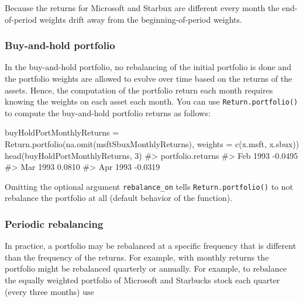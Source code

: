 \documentclass[
  letterpaper,
  DIV=11,
  numbers=noendperiod]{scrreprt}
\newenvironment{Shaded}{\begin{snugshade}}{\end{snugshade}}
\newcommand{\AttributeTok}[1]{\textcolor[rgb]{0.40,0.45,0.13}{#1}}
\newcommand{\CommentTok}[1]{\textcolor[rgb]{0.37,0.37,0.37}{#1}}
\newcommand{\DecValTok}[1]{\textcolor[rgb]{0.68,0.00,0.00}{#1}}
\newcommand{\FunctionTok}[1]{\textcolor[rgb]{0.28,0.35,0.67}{#1}}
\newcommand{\NormalTok}[1]{\textcolor[rgb]{0.00,0.23,0.31}{#1}}
\newcommand{\OtherTok}[1]{\textcolor[rgb]{0.00,0.23,0.31}{#1}}
\theoremstyle{definition}
\theoremstyle{definition}
\theoremstyle{remark}
\begin{document}
Because the returns for Microsoft and Starbux are different every month
the end-of-period weights drift away from the beginning-of-period
weights.

\hypertarget{buy-and-hold-portfolio}{%
\subsubsection{Buy-and-hold portfolio}\label{buy-and-hold-portfolio}}

In the buy-and-hold portfolio, no rebalancing of the initial portfolio
is done and the portfolio weights are allowed to evolve over time based
on the returns of the assets. Hence, the computation of the portfolio
return each month requires knowing the weights on each asset each month.
You can use \texttt{Return.portfolio()} to compute the buy-and-hold
portfolio returns as follows:

\begin{Shaded}
\begin{Highlighting}[]
\NormalTok{buyHoldPortMonthlyReturns }\OtherTok{=} 
  \FunctionTok{Return.portfolio}\NormalTok{(}\FunctionTok{na.omit}\NormalTok{(msftSbuxMonthlyReturns),}
                   \AttributeTok{weights =} \FunctionTok{c}\NormalTok{(x.msft, x.sbux))}
\FunctionTok{head}\NormalTok{(buyHoldPortMonthlyReturns, }\DecValTok{3}\NormalTok{)}
\CommentTok{\#\textgreater{}          portfolio.returns}
\CommentTok{\#\textgreater{} Feb 1993           {-}0.0495}
\CommentTok{\#\textgreater{} Mar 1993            0.0810}
\CommentTok{\#\textgreater{} Apr 1993           {-}0.0319}
\end{Highlighting}
\end{Shaded}

Omitting the optional argument \texttt{rebalance\_on} tells
\texttt{Return.portfolio()} to not rebalance the portfolio at all
(default behavior of the function).

\hypertarget{periodic-rebalancing}{%
\subsubsection{Periodic rebalancing}\label{periodic-rebalancing}}

In practice, a portfolio may be rebalanced at a specific frequency that
is different than the frequency of the returns. For example, with
monthly returns the portfolio might be rebalanced quarterly or annually.
For example, to rebalance the equally weighted portfolio of Microsoft
and Starbucks stock each quarter (every three months) use
\end{document}
